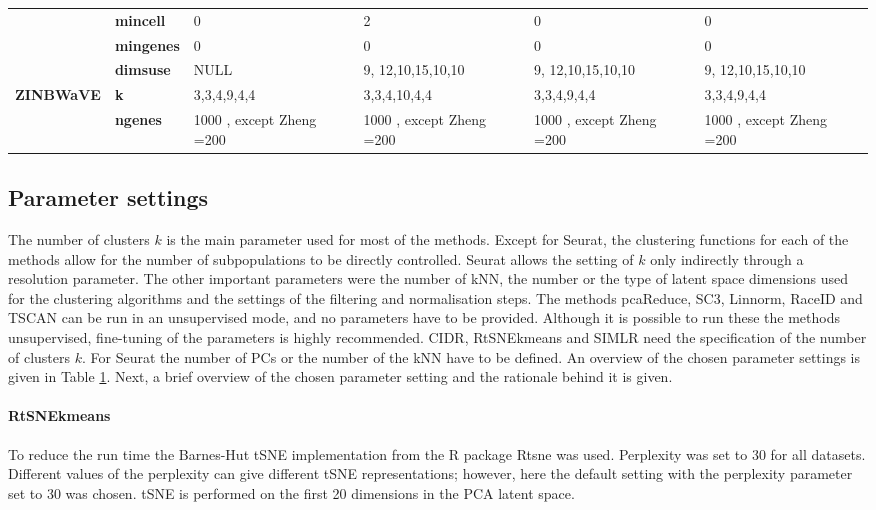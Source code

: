 \documentclass[12pt, a4paper]{article}\usepackage[]{graphicx}\usepackage[]{color}
\begin{document}
\begin{table}[htbp]
{\begin{tabular}{rp{5.585em}llll}
          & \textbf{mincell} & 0     & 2     & 0     & 0 \\
          & \textbf{mingenes} & 0     & 0     & 0     & 0 \\
          & \textbf{dimsuse} & NULL  & 9, 12,10,15,10,10 & 9, 12,10,15,10,10 & 9, 12,10,15,10,10 \\
    \midrule
    \multicolumn{1}{l}{\textbf{ZINBWaVE}} & \textbf{k} & \multicolumn{1}{p{13.335em}}{3,3,4,9,4,4} & 3,3,4,10,4,4 & \multicolumn{1}{p{9.085em}}{3,3,4,9,4,4} & \multicolumn{1}{p{9.835em}}{3,3,4,9,4,4} \\
          & \textbf{ngenes} & 1000 , except Zheng =200 & 1000 , except Zheng =200 & 1000 , except Zheng =200 & 1000 , except Zheng =200 \\
    \bottomrule
    \end{tabular}}%
  \label{tab:parameter}%
\end{table}%
\newpage
\subsection{Parameter settings}
The number of clusters $k$ is the main parameter used for most of the methods. Except for Seurat, the clustering functions for each of the methods allow for the number of subpopulations to be directly controlled. Seurat allows the setting of $k$ only indirectly through a resolution parameter. 
The other important parameters were the number of kNN, the number or the type of latent space dimensions used for the clustering algorithms and the settings of the filtering and normalisation steps. The methods pcaReduce, SC3, Linnorm, RaceID and TSCAN can be run in an unsupervised mode, and no parameters have to be provided. Although it is possible to run these the methods unsupervised, fine-tuning of the parameters is highly recommended. CIDR, RtSNEkmeans and SIMLR need the specification of the number of clusters $k$.
For Seurat the number of PCs or the number of the kNN have to be defined. An overview of the chosen parameter settings is given in Table \ref{tab:parameter}.
Next, a brief overview of the chosen parameter setting and the rationale behind it is given.
\paragraph{RtSNEkmeans}
To reduce the run time the Barnes-Hut tSNE implementation from the R package Rtsne was used. Perplexity was set to 30 for all datasets. Different values of the perplexity can give different tSNE representations; however, here the default setting with the perplexity parameter set to 30 was chosen. tSNE is performed on the first 20 dimensions in the PCA latent space. 
\end{document}
